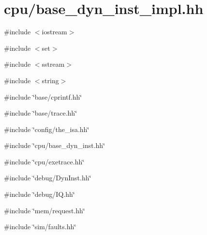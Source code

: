 \hypertarget{base__dyn__inst__impl_8hh}{
\section{cpu/base\_\-dyn\_\-inst\_\-impl.hh}
\label{base__dyn__inst__impl_8hh}
}
{\ttfamily \#include $<$iostream$>$}\par
{\ttfamily \#include $<$set$>$}\par
{\ttfamily \#include $<$sstream$>$}\par
{\ttfamily \#include $<$string$>$}\par
{\ttfamily \#include \char`\"{}base/cprintf.hh\char`\"{}}\par
{\ttfamily \#include \char`\"{}base/trace.hh\char`\"{}}\par
{\ttfamily \#include \char`\"{}config/the\_\-isa.hh\char`\"{}}\par
{\ttfamily \#include \char`\"{}cpu/base\_\-dyn\_\-inst.hh\char`\"{}}\par
{\ttfamily \#include \char`\"{}cpu/exetrace.hh\char`\"{}}\par
{\ttfamily \#include \char`\"{}debug/DynInst.hh\char`\"{}}\par
{\ttfamily \#include \char`\"{}debug/IQ.hh\char`\"{}}\par
{\ttfamily \#include \char`\"{}mem/request.hh\char`\"{}}\par
{\ttfamily \#include \char`\"{}sim/faults.hh\char`\"{}}\par
